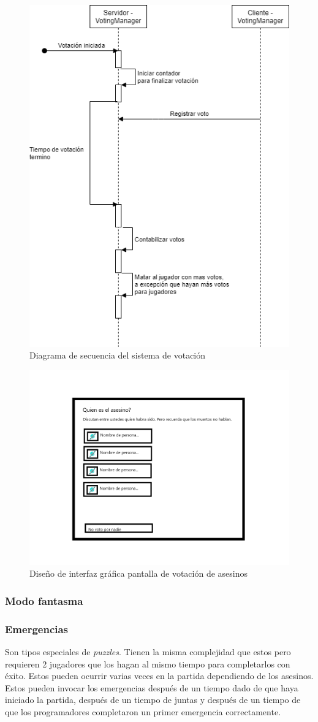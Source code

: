 \begin{figure}[h!]
    \centering
    \includegraphics[width=0.5\linewidth]{images/diagrama_secuencia_votos.png}
    \caption{Diagrama de secuencia del sistema de votación}
    \label{fig:diagrama_sec_votacion}
\end{figure}
\begin{figure}[h!]
    \centering
    \includegraphics[width=0.5\linewidth]{images/votacion.png}
    \caption{Diseño de interfaz gráfica pantalla de votación de asesinos}
    \label{fig:diagrama_ui_votacion}
\end{figure}

\subsubsection{Modo fantasma}


\subsubsection{Emergencias}
Son tipos especiales de \textit{puzzles}. Tienen la misma complejidad que estos pero requieren 2 jugadores que los hagan al mismo tiempo para completarlos con éxito. Estos pueden ocurrir varias veces en la partida dependiendo de los asesinos. Estos pueden invocar los emergencias después de un tiempo dado de que haya iniciado la partida, después de un tiempo de juntas y después de un tiempo de que los programadores completaron un primer emergencia correctamente.

